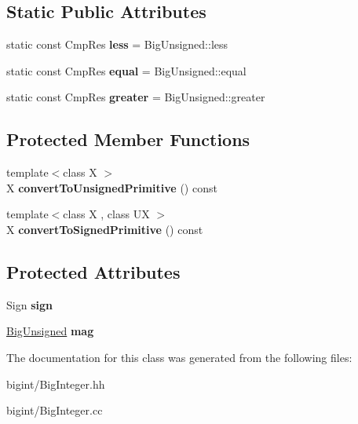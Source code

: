 \subsection*{Static Public Attributes}
\begin{DoxyCompactItemize}
\item 
\mbox{\label{class_big_integer_a33d12d768a6a6cc0ac55f1d5d3a3bf85}} 
static const Cmp\+Res {\bfseries less} = Big\+Unsigned\+::less
\item 
\mbox{\label{class_big_integer_a6af9bee51f320bbfb3138ade782d265f}} 
static const Cmp\+Res {\bfseries equal} = Big\+Unsigned\+::equal
\item 
\mbox{\label{class_big_integer_a58d296e453689114fe92b551a3a4ad28}} 
static const Cmp\+Res {\bfseries greater} = Big\+Unsigned\+::greater
\end{DoxyCompactItemize}
\subsection*{Protected Member Functions}
\begin{DoxyCompactItemize}
\item 
\mbox{\label{class_big_integer_a2960977fc2ba07a5d455103a88f9581e}} 
{\footnotesize template$<$class X $>$ }\\X {\bfseries convert\+To\+Unsigned\+Primitive} () const
\item 
\mbox{\label{class_big_integer_a02e00ce8c8f2826c06eab357342efb35}} 
{\footnotesize template$<$class X , class UX $>$ }\\X {\bfseries convert\+To\+Signed\+Primitive} () const
\end{DoxyCompactItemize}
\subsection*{Protected Attributes}
\begin{DoxyCompactItemize}
\item 
\mbox{\label{class_big_integer_a7504893ed5d8928d99c03e92c0727ed6}} 
Sign {\bfseries sign}
\item 
\mbox{\label{class_big_integer_a892d9475055eb633b56bf1e4c7094352}} 
\mbox{\hyperlink{class_big_unsigned}{Big\+Unsigned}} {\bfseries mag}
\end{DoxyCompactItemize}


The documentation for this class was generated from the following files\+:\begin{DoxyCompactItemize}
\item 
bigint/Big\+Integer.\+hh\item 
bigint/Big\+Integer.\+cc\end{DoxyCompactItemize}
